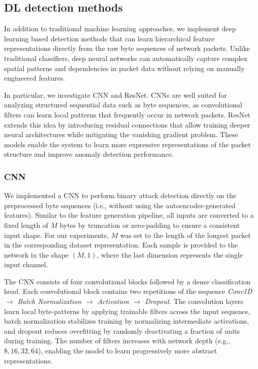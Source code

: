 \subsection{\ac{DL} detection methods}


In addition to traditional machine learning approaches, we implement deep learning based
detection methods that can learn hierarchical feature representations directly from the
raw byte sequences of network packets. Unlike traditional classifiers, deep neural networks
can automatically capture complex spatial patterns and dependencies in packet data without
relying on manually engineered features.

In particular, we investigate \ac{CNN} and \ac{ResNet}. \ac{CNN}s are well suited for analyzing structured sequential data such as byte
sequences, as convolutional filters can learn local patterns that frequently occur in
network packets. \ac{ResNet} extends this idea by introducing residual connections that allow
training deeper neural architectures while mitigating the vanishing gradient problem.
These models enable the system to learn more expressive representations of the packet
structure and improve anomaly detection performance.

\subsubsection{\ac{CNN}}

We implemented a \ac{CNN} to perform binary attack detection directly on the preprocessed byte sequences (i.e., without using the autoencoder-generated features). Similar to the feature generation pipeline, all
inputs are converted to a fixed length of $M$ bytes by truncation or zero-padding to ensure a
consistent input shape. For our experiments, $M$ was set to the length of the longest packet
in the corresponding dataset representation. Each sample is provided to the network in the
shape $(M,1)$, where the last dimension represents the single input channel.

The CNN consists of four convolutional blocks followed by a dense classification head.
Each convolutional block contains two repetitions of the sequence
\emph{Conv1D $\rightarrow$ Batch Normalization $\rightarrow$ Activation $\rightarrow$ Dropout}.
The convolution layers learn local byte-patterns by applying trainable filters across the input
sequence, batch normalization stabilizes training by normalizing intermediate activations, and
dropout reduces overfitting by randomly deactivating a fraction of units during training.
The number of filters increases with network depth (e.g., $8,16,32,64$), enabling the model to
learn progressively more abstract representations.

